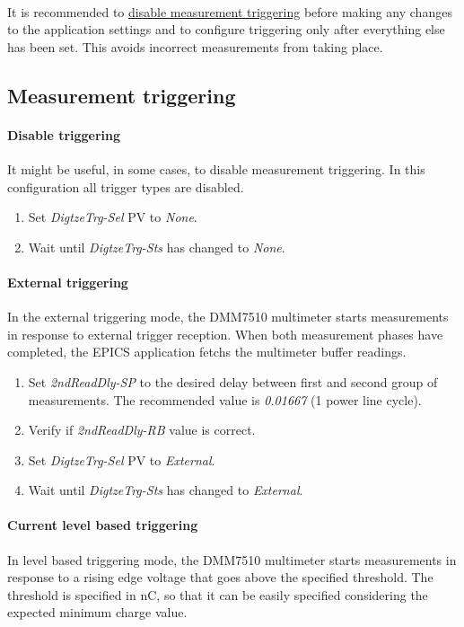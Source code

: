 \documentclass[openany]{article}
\begin{document}
	\paragraph{} It is recommended to \hyperref[disable-triggering]{disable measurement triggering} before making any changes to the application settings and to configure triggering only after everything else has been set. This avoids incorrect measurements from taking place.

	\subsection{Measurement triggering}

		\paragraph{Disable triggering}\label{disable-triggering} It might be useful, in some cases, to disable measurement triggering. In this configuration all trigger types are disabled.

			\begin{enumerate}
			\item Set \emph{DigtzeTrg-Sel} PV to \emph{None}.
			\item Wait until \emph{DigtzeTrg-Sts} has changed to \emph{None}.
			\end{enumerate}

		\paragraph{External triggering} In the external triggering mode, the DMM7510 multimeter starts measurements in response to external trigger reception. When both measurement phases have completed, the EPICS application fetchs the multimeter buffer readings.

			\begin{enumerate}
			\item Set \emph{2ndReadDly-SP} to the desired delay between first and second group of measurements. The recommended value is \emph{0.01667} (1 power line cycle).
			\item Verify if \emph{2ndReadDly-RB} value is correct.
			\item Set \emph{DigtzeTrg-Sel} PV to \emph{External}.
			\item Wait until \emph{DigtzeTrg-Sts} has changed to \emph{External}.
			\end{enumerate}

		\paragraph{Current level based triggering} In level based triggering mode, the DMM7510 multimeter starts measurements in response to a rising edge voltage that goes above the specified threshold. The threshold is specified in nC, so that it can be easily specified considering the expected minimum charge value.
\end{document}
